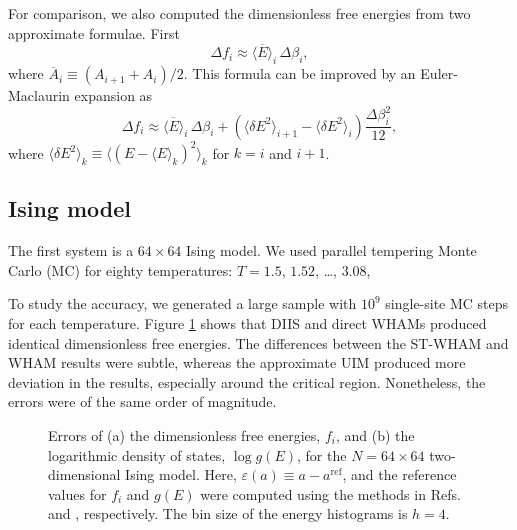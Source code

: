 \documentclass[reprint,aip,jcp,superscriptaddress]{revtex4-1}
\begin{document}
For comparison,
we also computed the dimensionless free energies from two approximate formulae.
%
First\cite{park2007}
%
\begin{equation}
\Delta f_i
\approx
\overline{ \langle E \rangle }_i \, \Delta \beta_i,
\label{eq:df_eav}
\end{equation}
where
$\overline{ A }_i \equiv (A_{i+1} + A_i)/2$.
%
This formula can be improved
by an Euler-Maclaurin expansion\cite{
arfken, *abramowitz, *wang_specfunc, whittaker}
as
%
\begin{equation}
\Delta f_i
\approx
\overline{ \langle E \rangle }_i \, \Delta \beta_i
+
\left(
  \langle \delta E^2 \rangle_{i+1}
-
  \langle \delta E^2 \rangle_i
\right)
\frac{ \Delta \beta_i^2 }{ 12 },
\label{eq:df_eavb}
\end{equation}
%
where
$\langle \delta E^2 \rangle_k
\equiv \langle (E - \langle E \rangle_k)^2 \rangle_k$
for $k = i$ and $i + 1$.



\subsection{\label{sec:results_Ising}
Ising model}





The first system is
a $64\times64$ Ising model.
%
We used parallel tempering\cite{
swendsen1986, *geyer1991, *hukushima1996, *hansmann1997, *earl2005}
Monte Carlo (MC)
for
eighty temperatures: $T = 1.5$, $1.52$, \dots, $3.08$,



To study the accuracy,
we generated a large sample with
$10^9$ single-site MC steps for each temperature.
%
Figure \ref{fig:is2ref} shows that
DIIS and direct WHAMs produced identical
dimensionless free energies.
%
The differences between the ST-WHAM and WHAM results
were subtle,
whereas the approximate UIM
produced more deviation in the results,
especially around the critical region.
%
Nonetheless,
the errors were of the same order of magnitude.



\begin{figure}[h]
  \caption{
    \label{fig:is2ref}
    Errors of
    (a) the dimensionless free energies, $f_i$, and
    (b) the logarithmic density of states, $\log g(E)$,
    for the $N = 64\times64$ two-dimensional Ising model.
    Here,
    $\varepsilon(a) \equiv a - a^\mathrm{ref}$,
    and the reference values for $f_i$ and $g(E)$
    were computed using the methods in
    Refs.  and ,
    respectively.
    The bin size of the energy histograms is $h = 4$.
  }
\end{figure}
\end{document}
